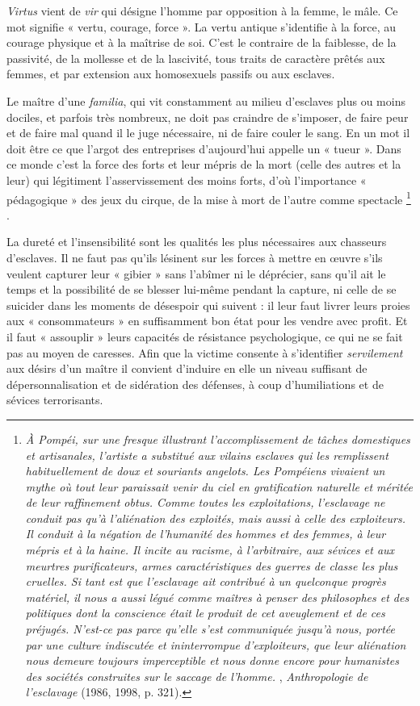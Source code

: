  \emph{Virtus} vient de \emph{vir} qui désigne l'homme par opposition à la femme, le mâle. Ce mot signifie « vertu, courage, force ». La vertu antique s'identifie à la force, au courage physique et à la maîtrise de soi. C'est le contraire de la faiblesse, de la passivité, de la mollesse et de la lascivité, tous traits de caractère prêtés aux femmes, et par extension aux homosexuels passifs ou aux esclaves. 

 Le maître d'une \emph{familia}, qui vit constamment au milieu d'esclaves plus ou moins dociles, et parfois très nombreux, ne doit pas craindre de s'imposer, de faire peur et de faire mal quand il le juge nécessaire, ni de faire couler le sang. En un mot il doit être ce que l'argot des entreprises d'aujourd'hui appelle un « tueur ». Dans ce monde c'est la force des forts et leur mépris de la mort (celle des autres et la leur) qui légitiment l'asservissement des moins forts, d'où l'importance « pédagogique » des jeux du cirque, de la mise à mort de l'autre comme spectacle%
\footnote{\emph{À Pompéi, sur une fresque illustrant l'accomplissement de tâches domestiques et artisanales, l'artiste a substitué aux vilains esclaves qui les remplissent habituellement de doux et souriants angelots. Les Pompéiens vivaient un mythe où tout leur paraissait venir du ciel en gratification naturelle et méritée de leur raffinement obtus. Comme toutes les exploitations, l'esclavage ne conduit pas qu'à l'aliénation des exploités, mais aussi à celle des exploiteurs. Il conduit à la négation de l'humanité des hommes et des femmes, à leur mépris et à la haine. Il incite au racisme, à l'arbitraire, aux sévices et aux meurtres purificateurs, armes caractéristiques des guerres de classe les plus cruelles. Si tant est que l'esclavage ait contribué à un quelconque progrès matériel, il nous a aussi légué comme maîtres à penser des philosophes et des politiques dont la conscience était le produit de cet aveuglement et de ces préjugés. N'est-ce pas parce qu'elle s'est communiquée jusqu'à nous, portée par une culture indiscutée et ininterrompue d'exploiteurs, que leur aliénation nous demeure toujours imperceptible et nous donne encore pour humanistes des sociétés construites sur le saccage de l'homme.} , \emph{Anthropologie de l'esclavage} (1986, 1998, p. 321).}%
.

 La dureté et l'insensibilité sont les qualités les plus nécessaires aux chasseurs d'esclaves. Il ne faut pas qu'ils lésinent sur les forces à mettre en œuvre s'ils veulent capturer leur « gibier » sans l'abîmer ni le déprécier, sans qu'il ait le temps et la possibilité de se blesser lui-même pendant la capture, ni celle de se suicider dans les moments de désespoir qui suivent : il leur faut livrer leurs proies aux « consommateurs » en suffisamment bon état pour les vendre avec profit. Et il faut « assouplir » leurs capacités de résistance psychologique, ce qui ne se fait pas au moyen de caresses. Afin que la victime consente à s'identifier \emph{servilement} aux désirs d'un maître il convient d'induire en elle un niveau suffisant de dépersonnalisation et de sidération des défenses, à coup d'humiliations et de sévices terrorisants. 

